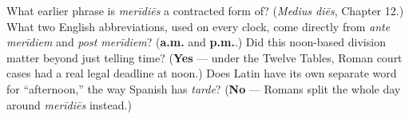 \begin{tcolorbox}[breakable,colback=teal!4,colframe=teal!35!black,title={Before you move on}]
What earlier phrase is \emph{merīdiēs} a contracted form of? (\emph{Medius diēs}, Chapter 12.) What two English abbreviations, used on every clock, come directly from \emph{ante merīdiem} and \emph{post merīdiem}? (\textbf{a.m.} and \textbf{p.m.}.) Did this noon-based division matter beyond just telling time? (\textbf{Yes} — under the Twelve Tables, Roman court cases had a real legal deadline at noon.) Does Latin have its own separate word for \textquotedblleft{}afternoon,\textquotedblright{} the way Spanish has \emph{tarde}? (\textbf{No} — Romans split the whole day around \emph{merīdiēs} instead.)
\end{tcolorbox}
